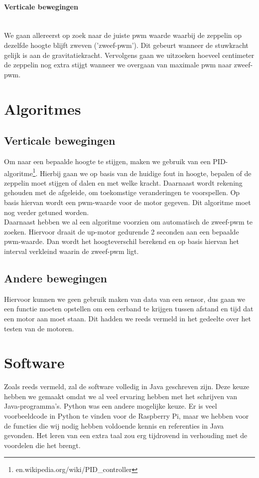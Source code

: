 \documentclass[tt]{penoverslag}
\begin{document}
\paragraph{Verticale bewegingen} ~\\ 
We gaan allereerst op zoek naar de juiste pwm waarde waarbij de zeppelin op dezelfde hoogte blijft zweven ('zweef-pwm').  Dit gebeurt wanneer de stuwkracht gelijk is aan de gravitatiekracht.  Vervolgens gaan we uitzoeken hoeveel centimeter de zeppelin nog extra stijgt wanneer we overgaan van maximale pwm naar zweef-pwm.\\



\section{Algoritmes}
\subsection{Verticale bewegingen}
Om naar een bepaalde hoogte te stijgen, maken we gebruik van een PID-algoritme\footnote{en.wikipedia.org/wiki/PID\_controller}. Hierbij gaan we op basis van de huidige fout in hoogte, bepalen of de zeppelin moet stijgen of dalen en met welke kracht. Daarnaast wordt rekening gehouden met de afgeleide, om toekomstige veranderingen te voorspellen. Op basis hiervan wordt een pwm-waarde voor de motor gegeven. Dit algoritme moet nog verder getuned worden. \\

Daarnaast hebben we al een algoritme voorzien om automatisch de zweef-pwm te zoeken. Hiervoor draait de up-motor gedurende 2 seconden aan een bepaalde pwm-waarde. Dan wordt het hoogteverschil berekend en op basis hiervan het interval verkleind waarin de zweef-pwm ligt. \\

\subsection{Andere bewegingen}
Hiervoor kunnen we geen gebruik maken van data van een sensor, dus gaan we een functie moeten opstellen om een cerband te krijgen tussen afstand en tijd dat een motor aan moet staan. Dit hadden we reeds vermeld in het gedeelte over het testen van de motoren. \\

\section{Software}
Zoals reeds vermeld, zal de software volledig in Java geschreven zijn. Deze keuze hebben we gemaakt omdat we al veel ervaring hebben met het schrijven van Java-programma's. Python was een andere mogelijke keuze. Er is veel voorbeeldcode in Python te vinden voor de Raspberry Pi, maar we hebben voor de functies die wij nodig hebben voldoende kennis en referenties in Java gevonden. Het leren van een extra taal zou erg tijdrovend in verhouding met de voordelen die het brengt. \\
\end{document}
